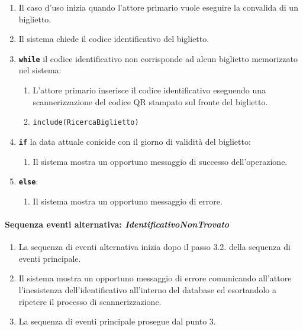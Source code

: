\documentclass{article}
\begin{document}
		\begin{enumerate}[itemsep=8pt,parsep=0pt]
		
				\item Il caso d'uso inizia quando l'attore primario vuole eseguire la convalida di un biglietto. 
		
				\item Il sistema chiede il codice identificativo del biglietto.

				\item \texttt{\textbf{while}} il codice identificativo non corrisponde ad alcun biglietto memorizzato nel sistema:
					\begin{enumerate}	[leftmargin=28pt]
						\item L'attore primario inserisce il codice identificativo eseguendo una scannerizzazione del codice QR stampato sul fronte del biglietto.
						\item \texttt{include(RicercaBiglietto)}
		  			\end{enumerate}	

				\item \texttt{\textbf{if}} la data attuale conicide con il giorno di validità del biglietto:
					\begin{enumerate}	[leftmargin=28pt]
						\item Il sistema mostra un opportuno messaggio di successo dell'operazione.
		  			\end{enumerate}	
				\item \texttt{\textbf{else}}:
					\begin{enumerate}	[leftmargin=28pt]
						\item Il sistema mostra un opportuno messaggio di errore.
		  			\end{enumerate}	
				
		\end{enumerate}	
	
	\paragraph{Sequenza eventi alternativa: \emph{IdentificativoNonTrovato}}

		\begin{enumerate}[itemsep=8pt,parsep=0pt]
				\item La sequenza di eventi alternativa inizia dopo il passo 3.2. della sequenza di eventi principale.
				\item Il sistema mostra un opportuno messaggio di errore comunicando all'attore l'inesistenza dell'identificativo all'interno del database ed esortandolo a ripetere il processo di scannerizzazione.
				\item La sequenza di eventi principale prosegue dal punto 3.
		\end{enumerate}
\end{document}
